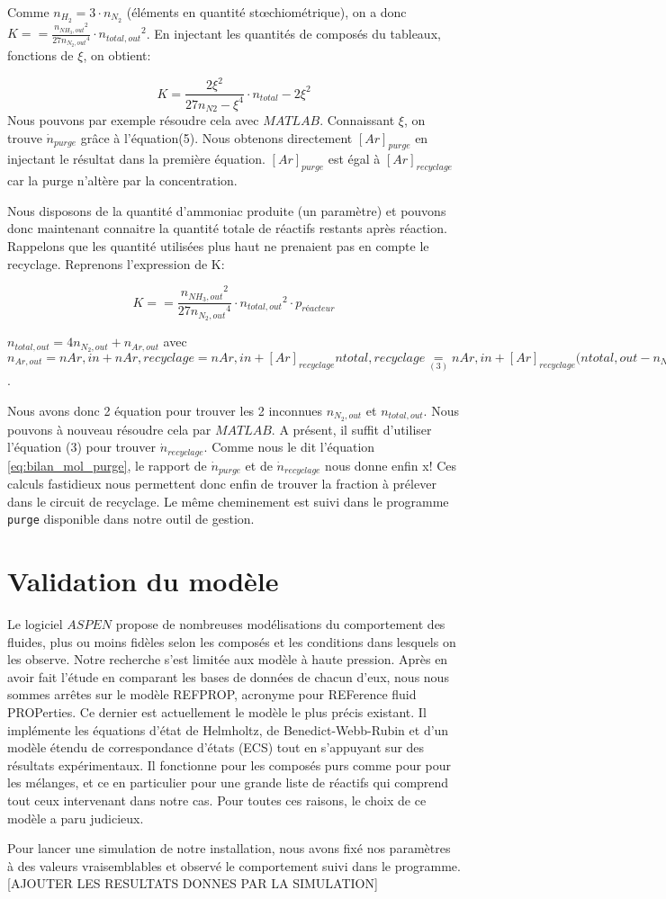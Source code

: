 \documentclass[a4paper, oneside, 12pt]{article}
\begin{document}
Comme $n_{H_2}=3\cdot n_{N_2}$ (éléments en quantité stœchiométrique), on a donc 
$K==\frac{{n_{NH_3,out}}^2}{27{n_{N_2,out}}^4}\cdot {n_{total,out}}^2$. En injectant les 
quantités de composés du tableaux, fonctions de $\xi$, on obtient:

\[ K=\frac{{2\xi}^2}{27{{n_{N2}-\xi}^4}}\cdot {n_{total}-2\xi}^2 \]
Nous pouvons par exemple résoudre cela avec $MATLAB$. 
Connaissant $\xi$, on trouve $\dot{n}_{purge}$ grâce à l'équation(5). 
Nous obtenons directement $[Ar]_{purge}$ en injectant 
le résultat dans la première équation. $[Ar]_{purge}$ est égal à $[Ar]_{recyclage}$ 
car la purge n'altère par la concentration.

Nous disposons de la quantité d'ammoniac produite (un paramètre) 
et pouvons donc maintenant connaitre la quantité totale de réactifs restants après réaction. 
Rappelons que les quantité utilisées plus haut ne prenaient pas en compte le recyclage. 
Reprenons l'expression de K: 

\[ K==\frac{{n_{NH_3,out}}^2}{27{n_{N_2,out}}^4}\cdot {n_{total,out}}^2\cdot p_{réacteur} \]

$n_{total,out}=4n_{N_2,out}+n_{Ar,out}$ 
avec $n_{Ar,out}=n{Ar,in}+n{Ar,recyclage}=n{Ar,in}+[Ar]_{recyclage}n{total,recyclage}\underset{(3)}=n{Ar,in}+[Ar]_{recyclage}(n{total,out}-n_{NH_3,out}$.

Nous avons donc 2 équation pour trouver les 2 inconnues $n_{N_2,out}$ et $n_{total,out}$. 
Nous pouvons à nouveau résoudre cela par $MATLAB$. 
A présent, il suffit d'utiliser l'équation (3) pour trouver $\dot{n}_{recyclage}$. 
Comme nous le dit l'équation \ref{eq:bilan_mol_purge}, le rapport de $\dot{n}_{purge}$ 
et de $\dot{n}_{recyclage}$ nous donne enfin x! 
Ces calculs fastidieux nous permettent donc enfin de trouver la fraction à prélever 
dans le circuit de recyclage. 
Le même cheminement est suivi dans le programme \texttt{purge} disponible dans notre outil de gestion.

\section{Validation du modèle}

Le logiciel $ASPEN$ propose de nombreuses modélisations du comportement des fluides, 
plus ou moins fidèles selon les composés et les conditions dans lesquels on les observe. 
Notre recherche s'est limitée aux modèle à haute pression. 
Après en avoir fait l'étude en comparant les bases de données de chacun d'eux, 
nous nous sommes arrêtes sur le modèle REFPROP, acronyme pour REFerence fluid PROPerties. 
Ce dernier est actuellement le modèle le plus précis existant. 
Il implémente les équations d'état de Helmholtz, de Benedict-Webb-Rubin 
et d'un modèle étendu de correspondance d'états (ECS) tout en s'appuyant sur des résultats expérimentaux. 
Il fonctionne pour les composés purs comme pour pour les mélanges, 
et ce en particulier pour une grande liste de réactifs qui comprend tout ceux intervenant dans notre cas. 
Pour toutes ces raisons, le choix de ce modèle a paru judicieux.

Pour lancer une simulation de notre installation, 
nous avons fixé nos paramètres à des valeurs vraisemblables 
et observé le comportement suivi dans le programme. 
[AJOUTER LES RESULTATS DONNES PAR LA SIMULATION]
\end{document}
